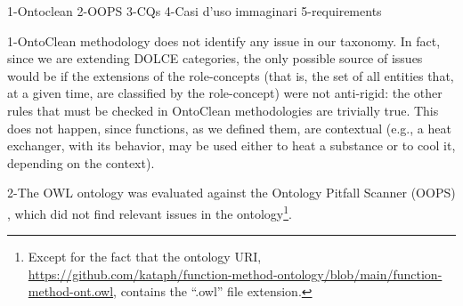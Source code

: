 \documentclass[sw]{iosart2x}
\newcommand{\DOLCE}{\textsc{DOLCE}\xspace} %
\newcommand{\OWL}{\textnormal{OWL}\xspace}
\newcommand{\qquotes}[1]{``#1''}
\newcommand{\TODO}[1]{{\color{red} #1
}}
\begin{document}
\TODO{

1-Ontoclean
2-OOPS
3-CQs
4-Casi d'uso immaginari
5-requirements

1-OntoClean methodology \cite{guarinoOverviewOntoClean2009} does not identify any issue in our taxonomy.
In fact, since we are extending \DOLCE categories, the only possible source of issues would be if the extensions of the role-concepts (that is, the set of all entities that, at a given time, are classified by the role-concept) were not anti-rigid: the other rules that must be checked in OntoClean methodologies are trivially true. 
This does not happen, since functions, as we defined them, are contextual (e.g., a heat exchanger, with its behavior, may be used either to heat a substance or to cool it, depending on the context). 

2-The \OWL ontology was evaluated against the Ontology Pitfall Scanner (OOPS) \cite{poveda2014oops}, which did not find relevant issues in the ontology\footnote{Except for the fact that the ontology URI, \url{https://github.com/kataph/function-method-ontology/blob/main/function-method-ont.owl}, contains the \qquotes{.owl} file extension.}.


}
\end{document}
